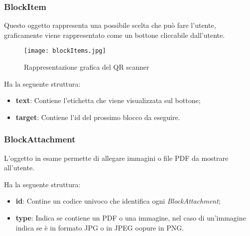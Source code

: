 \subsubsection*{BlockItem}
Questo oggetto rappresenta una possibile scelta che può fare l'utente, graficamente viene rappresentato come un bottone cliccabile dall'utente.

\begin{figure}[h]
	\centering
	\texttt{[image: blockItems.jpg]}
	\caption{Rappresentazione grafica del QR scanner}
\end{figure}
Ha la seguente struttura:

\begin{itemize}
	\item \textbf{text}: Contiene l'etichetta che viene visualizzata sul bottone;
	\item \textbf{target}: Contiene l'id del prossimo blocco da eseguire.
\end{itemize}



\subsubsection*{BlockAttachment} 
L'oggetto in esame permette di allegare immagini o file PDF da mostrare all'utente.

Ha la seguente struttura:

\begin{itemize}
	\item \textbf{id}: Contine un codice univoco che identifica ogni \textsl{BlockAttachment};
	\item \textbf{type}: Indica se contiene un PDF o una immagine, nel caso di un'immagine indica se è in formato \textsf{JPG} o in \textsf{JPEG} oopure in \textsf{PNG}.
\end{itemize}	
